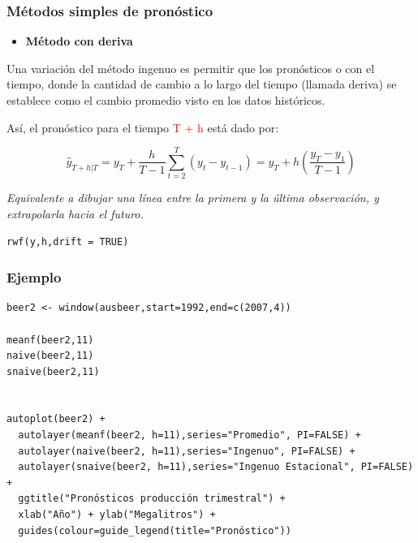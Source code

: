 \documentclass[10pt]{beamer}
\begin{document}
\begin{frame}[fragile]
\frametitle{Métodos simples de pronóstico}


\begin{itemize}
\item \textbf{Método con deriva}
\end{itemize}

\vspace{4mm}

Una variación del método ingenuo es permitir que los pronósticos  o  con el tiempo, donde la cantidad de cambio a lo largo del tiempo (llamada deriva) se establece como el cambio promedio visto en los datos históricos.

\vspace{4mm}

Así, el pronóstico para el tiempo \textcolor{red}{T + h} está dado por:


\begin{equation}
\hat{y}_{T+h|T} = y_{T} + \frac{h}{T-1} \sum^{T}_{t=2} (y_t -y_{t-1}) = y_T + h\left( \frac{y_T - y_1}{T-1}\right) 
\end{equation}


\textit{Equivalente a dibujar una línea entre la primera y la última observación, y extrapolarla hacia el futuro.}

\lstset{language=r,label= ,caption= ,captionpos=b,numbers=none}
\begin{lstlisting}
rwf(y,h,drift = TRUE)
\end{lstlisting}



\end{frame}





\begin{frame}[fragile]
\frametitle{Ejemplo}



\lstset{language=r,label= ,caption= ,captionpos=b,numbers=none}
\begin{lstlisting}
beer2 <- window(ausbeer,start=1992,end=c(2007,4))

meanf(beer2,11)
naive(beer2,11)
snaive(beer2,11)


autoplot(beer2) +
  autolayer(meanf(beer2, h=11),series="Promedio", PI=FALSE) +
  autolayer(naive(beer2, h=11),series="Ingenuo", PI=FALSE) +
  autolayer(snaive(beer2, h=11),series="Ingenuo Estacional", PI=FALSE) +
  ggtitle("Pronósticos producción trimestral") +
  xlab("Año") + ylab("Megalitros") +
  guides(colour=guide_legend(title="Pronóstico"))

\end{lstlisting}



\end{frame}
\end{document}
